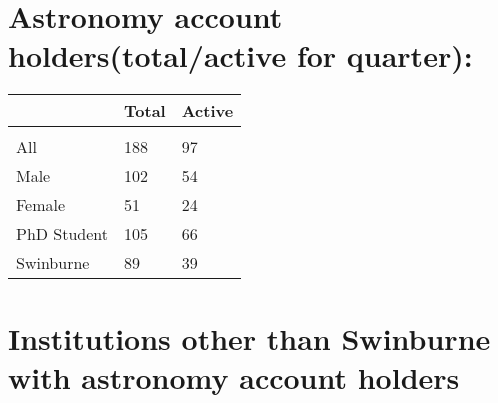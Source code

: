 \documentclass{article}%
\begin{document}
\section{Astronomy account holders(total/active for quarter): }%

%
\begin{longtabu}{X[l] X[r] X[r]}%
\textbf{}&\textbf{Total}&\textbf{Active}\\%
\hline%
&&\\%
All&188&97\\%
\hline%
Male&102&54\\%
\hline%
Female&51&24\\%
\hline%
PhD Student&105&66\\%
\hline%
Swinburne&89&39\\%
\hline%
\end{longtabu}%
\section{Institutions other than Swinburne with astronomy account holders}%
\end{document}
